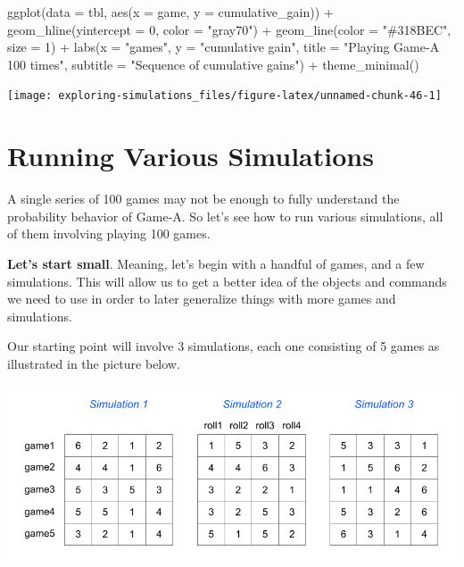 \documentclass[
]{book}
\newenvironment{Shaded}{\begin{snugshade}}{\end{snugshade}}
\newcommand{\AttributeTok}[1]{\textcolor[rgb]{0.77,0.63,0.00}{#1}}
\newcommand{\DecValTok}[1]{\textcolor[rgb]{0.00,0.00,0.81}{#1}}
\newcommand{\FunctionTok}[1]{\textcolor[rgb]{0.00,0.00,0.00}{#1}}
\newcommand{\NormalTok}[1]{#1}
\newcommand{\SpecialCharTok}[1]{\textcolor[rgb]{0.00,0.00,0.00}{#1}}
\newcommand{\StringTok}[1]{\textcolor[rgb]{0.31,0.60,0.02}{#1}}
\begin{document}
\begin{Shaded}
\begin{Highlighting}[]
\FunctionTok{ggplot}\NormalTok{(}\AttributeTok{data =}\NormalTok{ tbl, }\FunctionTok{aes}\NormalTok{(}\AttributeTok{x =}\NormalTok{ game, }\AttributeTok{y =}\NormalTok{ cumulative\_gain)) }\SpecialCharTok{+} 
  \FunctionTok{geom\_hline}\NormalTok{(}\AttributeTok{yintercept =} \DecValTok{0}\NormalTok{, }\AttributeTok{color =} \StringTok{"gray70"}\NormalTok{) }\SpecialCharTok{+}
  \FunctionTok{geom\_line}\NormalTok{(}\AttributeTok{color =} \StringTok{"\#318BEC"}\NormalTok{, }\AttributeTok{size =} \DecValTok{1}\NormalTok{) }\SpecialCharTok{+}
  \FunctionTok{labs}\NormalTok{(}\AttributeTok{x =} \StringTok{"games"}\NormalTok{, }
       \AttributeTok{y =} \StringTok{"cumulative gain"}\NormalTok{, }
       \AttributeTok{title =} \StringTok{"Playing Game{-}A 100 times"}\NormalTok{,}
       \AttributeTok{subtitle =} \StringTok{"Sequence of cumulative gains"}\NormalTok{) }\SpecialCharTok{+}
  \FunctionTok{theme\_minimal}\NormalTok{()}
\end{Highlighting}
\end{Shaded}

\begin{center}\texttt{[image: exploring-simulations\_files/figure-latex/unnamed-chunk-46-1]} \end{center}

\hypertarget{running-various-simulations}{%
\chapter{Running Various Simulations}\label{running-various-simulations}}

A single series of 100 games may not be enough to fully
understand the probability behavior of Game-A. So let's see how to run various
simulations, all of them involving playing 100 games.

\textbf{Let's start small}. Meaning, let's begin with a handful of games, and a few
simulations. This will allow us to get a better idea of the objects and
commands we need to use in order to later generalize things with more games
and simulations.

Our starting point will involve 3 simulations, each one consisting of 5 games
as illustrated in the picture below.

\begin{center}\includegraphics[width=0.8\linewidth]{images/demere-3-simulations} \end{center}
\end{document}
